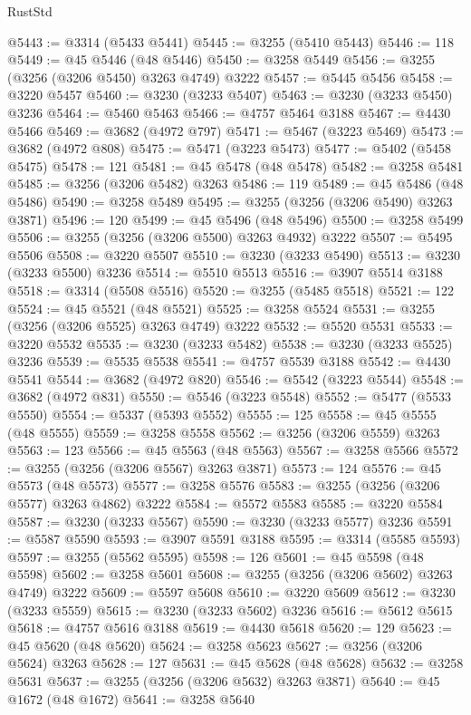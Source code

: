 \begin{lexlean}{RustStd}
\begin{coremodule}
@5443 := @3314 (@5433 @5441)
@5445 := @3255 (@5410 @5443)
@5446 := 118
@5449 := @45 @5446 (@48 @5446)
@5450 := @3258 @5449
@5456 := @3255 (@3256 (@3206 @5450) @3263 @4749) @3222
@5457 := @5445 @5456
@5458 := @3220 @5457
@5460 := @3230 (@3233 @5407)
@5463 := @3230 (@3233 @5450) @3236
@5464 := @5460 @5463
@5466 := @4757 @5464 @3188
@5467 := @4430 @5466
@5469 := @3682 (@4972 @797)
@5471 := @5467 (@3223 @5469)
@5473 := @3682 (@4972 @808)
@5475 := @5471 (@3223 @5473)
@5477 := @5402 (@5458 @5475)
@5478 := 121
@5481 := @45 @5478 (@48 @5478)
@5482 := @3258 @5481
@5485 := @3256 (@3206 @5482) @3263
@5486 := 119
@5489 := @45 @5486 (@48 @5486)
@5490 := @3258 @5489
@5495 := @3255 (@3256 (@3206 @5490) @3263 @3871)
@5496 := 120
@5499 := @45 @5496 (@48 @5496)
@5500 := @3258 @5499
@5506 := @3255 (@3256 (@3206 @5500) @3263 @4932) @3222
@5507 := @5495 @5506
@5508 := @3220 @5507
@5510 := @3230 (@3233 @5490)
@5513 := @3230 (@3233 @5500) @3236
@5514 := @5510 @5513
@5516 := @3907 @5514 @3188
@5518 := @3314 (@5508 @5516)
@5520 := @3255 (@5485 @5518)
@5521 := 122
@5524 := @45 @5521 (@48 @5521)
@5525 := @3258 @5524
@5531 := @3255 (@3256 (@3206 @5525) @3263 @4749) @3222
@5532 := @5520 @5531
@5533 := @3220 @5532
@5535 := @3230 (@3233 @5482)
@5538 := @3230 (@3233 @5525) @3236
@5539 := @5535 @5538
@5541 := @4757 @5539 @3188
@5542 := @4430 @5541
@5544 := @3682 (@4972 @820)
@5546 := @5542 (@3223 @5544)
@5548 := @3682 (@4972 @831)
@5550 := @5546 (@3223 @5548)
@5552 := @5477 (@5533 @5550)
@5554 := @5337 (@5393 @5552)
@5555 := 125
@5558 := @45 @5555 (@48 @5555)
@5559 := @3258 @5558
@5562 := @3256 (@3206 @5559) @3263
@5563 := 123
@5566 := @45 @5563 (@48 @5563)
@5567 := @3258 @5566
@5572 := @3255 (@3256 (@3206 @5567) @3263 @3871)
@5573 := 124
@5576 := @45 @5573 (@48 @5573)
@5577 := @3258 @5576
@5583 := @3255 (@3256 (@3206 @5577) @3263 @4862) @3222
@5584 := @5572 @5583
@5585 := @3220 @5584
@5587 := @3230 (@3233 @5567)
@5590 := @3230 (@3233 @5577) @3236
@5591 := @5587 @5590
@5593 := @3907 @5591 @3188
@5595 := @3314 (@5585 @5593)
@5597 := @3255 (@5562 @5595)
@5598 := 126
@5601 := @45 @5598 (@48 @5598)
@5602 := @3258 @5601
@5608 := @3255 (@3256 (@3206 @5602) @3263 @4749) @3222
@5609 := @5597 @5608
@5610 := @3220 @5609
@5612 := @3230 (@3233 @5559)
@5615 := @3230 (@3233 @5602) @3236
@5616 := @5612 @5615
@5618 := @4757 @5616 @3188
@5619 := @4430 @5618
@5620 := 129
@5623 := @45 @5620 (@48 @5620)
@5624 := @3258 @5623
@5627 := @3256 (@3206 @5624) @3263
@5628 := 127
@5631 := @45 @5628 (@48 @5628)
@5632 := @3258 @5631
@5637 := @3255 (@3256 (@3206 @5632) @3263 @3871)
@5640 := @45 @1672 (@48 @1672)
@5641 := @3258 @5640

\end{coremodule}
\end{lexlean}
